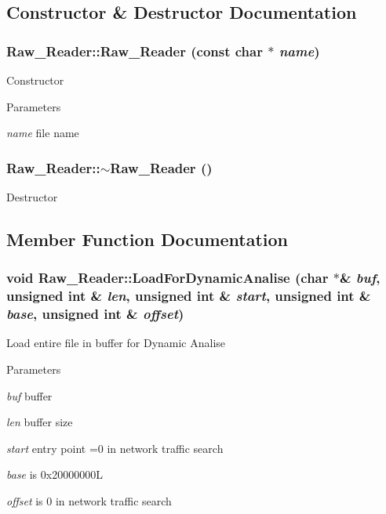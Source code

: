 \subsection{Constructor \& Destructor Documentation}
\hypertarget{classRaw__Reader_ae75aca0f781eca8af23e5ac27fa89aae}{
\subsubsection[{Raw\_\-Reader}]{\setlength{\rightskip}{0pt plus 5cm}Raw\_\-Reader::Raw\_\-Reader (const char $\ast$ {\em name})}}
\label{classRaw__Reader_ae75aca0f781eca8af23e5ac27fa89aae}
Constructor 
\begin{DoxyParams}{Parameters}
\item[{\em name}]file name \end{DoxyParams}
\hypertarget{classRaw__Reader_a146ea047af0f0319ada57c5e5768992e}{
\subsubsection[{$\sim$Raw\_\-Reader}]{\setlength{\rightskip}{0pt plus 5cm}Raw\_\-Reader::$\sim$Raw\_\-Reader ()}}
\label{classRaw__Reader_a146ea047af0f0319ada57c5e5768992e}
Destructor 

\subsection{Member Function Documentation}
\hypertarget{classRaw__Reader_a9e9a6cafa1b830d5c05b7a5e720c656c}{
\subsubsection[{LoadForDynamicAnalise}]{\setlength{\rightskip}{0pt plus 5cm}void Raw\_\-Reader::LoadForDynamicAnalise (char $\ast$\& {\em buf}, \/  unsigned int \& {\em len}, \/  unsigned int \& {\em start}, \/  unsigned int \& {\em base}, \/  unsigned int \& {\em offset})}}
\label{classRaw__Reader_a9e9a6cafa1b830d5c05b7a5e720c656c}
Load entire file in buffer for Dynamic Analise 
\begin{DoxyParams}{Parameters}
\item[{\em buf}]buffer \item[{\em len}]buffer size \item[{\em start}]entry point =0 in network traffic search \item[{\em base}]is 0x20000000L \item[{\em offset}]is 0 in network traffic search \end{DoxyParams}


